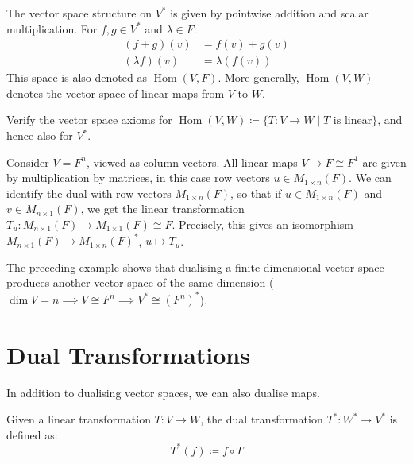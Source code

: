 \documentclass[../linear_algebra_and_groups.tex]{subfiles}
\begin{document}
The vector space structure on $V^*$ is given by pointwise addition and scalar multiplication. For $f, g \in V^*$ and $\lambda \in F$:
\begin{align*}
    (f+g)(v) &= f(v) + g(v) \\
    (\lambda f)(v) &= \lambda(f(v))
\end{align*}
This space is also denoted as $\operatorname{Hom}(V,F)$. More generally, $\operatorname{Hom}(V,W)$ denotes the vector space of linear maps from $V$ to $W$.

\begin{exercise*}
    Verify the vector space axioms for $\operatorname{Hom}(V,W) \coloneqq \{T : V \to W \mid T \text{ is linear}\}$, and hence also for $V^*$.
\end{exercise*}

\begin{example}
    Consider $V = F^n$, viewed as column vectors. All linear maps $V \to F \cong F^1$ are given by multiplication by matrices, in this case row vectors $u \in M_{1\times n}(F)$. We can identify the dual with row vectors $M_{1\times n}(F)$, so that if $u \in M_{1\times n}(F)$ and $v \in M_{n\times 1}(F)$, we get the linear transformation $T_u : M_{n\times 1}(F) \to M_{1\times 1}(F) \cong F$. Precisely, this gives an isomorphism $M_{n\times 1}(F) \to M_{1\times n}(F)^*$, $u \mapsto T_u$.
\end{example}

The preceding example shows that dualising a finite-dimensional vector space produces another vector space of the same dimension ($\dim V = n \implies V \cong F^n \implies V^* \cong (F^n)^*$). 

\section{Dual Transformations}

In addition to dualising vector spaces, we can also dualise maps.

\begin{definition}
    \begin{shaded*}
        Given a linear transformation $T : V \to W$, the dual transformation $T^* : W^* \to V^*$ is defined as:
        \[ T^*(f) \coloneqq f \circ T \]
    \end{shaded*}
\end{definition}
\end{document}
